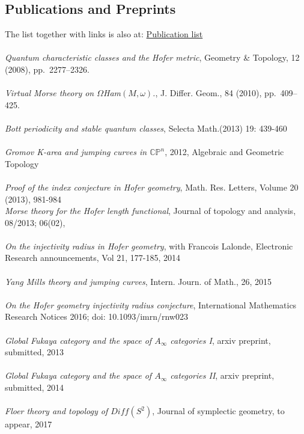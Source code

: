 \documentclass[overlapped,line,letterpaper]{res}
\begin{document}
\begin{resume}
\section {\sc Publications and Preprints} 
The list together with links is also at:
   \href{http://yashamon.github.io/web2/}{Publication list} \\\\
{\em {Quantum characteristic classes
and the Hofer metric}}, Geometry \& Topology, 12 (2008), pp.~2277--2326.\\\\
{\em {Virtual Morse
  theory on $\Omega $Ham$(M, \omega)$.}}, J. Differ. Geom., 84 (2010),
  pp.~409--425.\\\\ 
{\em{Bott periodicity and stable
quantum classes}}, Selecta Math.(2013) 19: 439-460\\\\ 
 {\em{Gromov K-area and jumping
curves in $ \mathbb{CP} ^{n}$}}, 2012, Algebraic and Geometric Topology \\\\
 {\em {Proof
of the index conjecture in Hofer geometry}}, Math. Res. Letters, Volume 20
(2013), 981-984 \\
\emph{Morse theory for the Hofer length functional}, Journal of topology and
analysis, 08/2013; 06(02), \\\\
{\em {On the injectivity radius in Hofer geometry}}, with Francois Lalonde, 
Electronic Research announcements, Vol 21, 177-185, 2014 \\\\
\emph {Yang Mills theory and jumping curves}, Intern. Journ. of Math.,
26,
2015 \\\\ 
\emph {On the Hofer geometry injectivity radius conjecture}, International Mathematics Research Notices 2016; doi: 10.1093/imrn/rnw023 \\\\
\emph{Global Fukaya category and the space of $A _{\infty} $
categories I},  arxiv preprint, submitted, 2013 \\\\
\emph {Global Fukaya category and the space of $A _{\infty} $
categories II},  arxiv preprint, submitted, 2014 \\\\
\emph {Floer theory and topology of $Diff (S ^{2} )$},  Journal of symplectic
geometry, to appear, 2017 \\\\

\end{resume}
\end{document}
